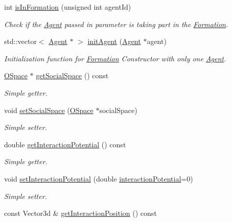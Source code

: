 \begin{DoxyCompactItemize}
int \hyperlink{classFormation_ae8b0264d952409f51306a85463cfc2e2}{is\+In\+Formation} (unsigned int agent\+Id)
\begin{DoxyCompactList}\small\item\em Check if the \hyperlink{classAgent}{Agent} passed in parameter is taking part in the \hyperlink{classFormation}{Formation}. \end{DoxyCompactList}\item 
std\+::vector$<$ \hyperlink{classAgent}{Agent} $\ast$ $>$ \hyperlink{classFormation_aaa0230f1b5c293a654da7bea95f0f840}{init\+Agent} (\hyperlink{classAgent}{Agent} $\ast$agent)
\begin{DoxyCompactList}\small\item\em Initialization function for \hyperlink{classFormation}{Formation} Constructor with only one \hyperlink{classAgent}{Agent}. \end{DoxyCompactList}\item 
\hyperlink{classOSpace}{O\+Space} $\ast$ \hyperlink{classFormation_a51d07ac063aa2897f2c756dfea14ff5e}{get\+Social\+Space} () const 
\begin{DoxyCompactList}\small\item\em Simple getter. \end{DoxyCompactList}\item 
void \hyperlink{classFormation_a4bb19bf1b792b5a909735160408216bf}{set\+Social\+Space} (\hyperlink{classOSpace}{O\+Space} $\ast$social\+Space)
\begin{DoxyCompactList}\small\item\em Simple setter. \end{DoxyCompactList}\item 
double \hyperlink{classFormation_a1e7f7add3878012188316df803ce5677}{get\+Interaction\+Potential} () const 
\begin{DoxyCompactList}\small\item\em Simple getter. \end{DoxyCompactList}\item 
void \hyperlink{classFormation_aeae0835beea6e8544837438d58bb6582}{set\+Interaction\+Potential} (double \hyperlink{classFormation_afac1af6d51a6b8a910df4574cb7a6931}{interaction\+Potential}=0)
\begin{DoxyCompactList}\small\item\em Simple setter. \end{DoxyCompactList}\item 
const Vector3d \& \hyperlink{classFormation_af6cf9389675ea316079ef643f55ffaae}{get\+Interaction\+Position} () const 

\end{DoxyCompactItemize}

